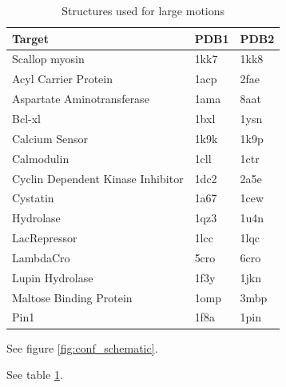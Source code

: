 \documentclass[10pt]{article}
\begin{document}
\begin{table} 
    \centering
    \caption{Structures used for large motions}
    \label{tbl:targets}
    \begin{tabular}{l l l}
    \hline
    Target                           & PDB1 & PDB2 \\
    \hline
	Scallop myosin                   & 1kk7 & 1kk8 \\
	Acyl Carrier Protein             & 1acp & 2fae \\
	Aspartate Aminotransferase       & 1ama & 8aat \\
	Bcl-xl                           & 1bxl & 1ysn \\
	Calcium Sensor                   & 1k9k & 1k9p \\
	Calmodulin                       & 1cll & 1ctr \\
	Cyclin Dependent Kinase Inhibitor & 1dc2 & 2a5e \\
	Cystatin                         & 1a67 & 1cew \\
	Hydrolase                        & 1qz3 & 1u4n \\
	LacRepressor                     & 1lcc & 1lqc \\
	LambdaCro                        & 5cro & 6cro \\
	Lupin Hydrolase                  & 1f3y & 1jkn \\
	Maltose Binding Protein          & 1omp & 3mbp \\
	Pin1                             & 1f8a & 1pin \\
        \hline
    \end{tabular}
\end{table}

See figure \ref{fig:conf_schematic}.

See table \ref{tbl:targets}.

 

\end{document}
